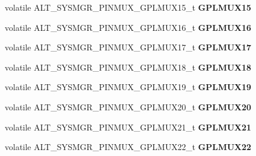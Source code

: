 \begin{DoxyCompactItemize}
volatile A\+L\+T\+\_\+\+S\+Y\+S\+M\+G\+R\+\_\+\+P\+I\+N\+M\+U\+X\+\_\+\+G\+P\+L\+M\+U\+X15\+\_\+t {\bfseries G\+P\+L\+M\+U\+X15}
\item 
\mbox{\label{structALT__SYSMGR__PINMUX__s_a7784a9b4f1f01d7b2e1102db66de13f8}} 
volatile A\+L\+T\+\_\+\+S\+Y\+S\+M\+G\+R\+\_\+\+P\+I\+N\+M\+U\+X\+\_\+\+G\+P\+L\+M\+U\+X16\+\_\+t {\bfseries G\+P\+L\+M\+U\+X16}
\item 
\mbox{\label{structALT__SYSMGR__PINMUX__s_ad2747839d7a380e489369f98df355bf9}} 
volatile A\+L\+T\+\_\+\+S\+Y\+S\+M\+G\+R\+\_\+\+P\+I\+N\+M\+U\+X\+\_\+\+G\+P\+L\+M\+U\+X17\+\_\+t {\bfseries G\+P\+L\+M\+U\+X17}
\item 
\mbox{\label{structALT__SYSMGR__PINMUX__s_a397f7b48293d4787fde76ef750ccc78f}} 
volatile A\+L\+T\+\_\+\+S\+Y\+S\+M\+G\+R\+\_\+\+P\+I\+N\+M\+U\+X\+\_\+\+G\+P\+L\+M\+U\+X18\+\_\+t {\bfseries G\+P\+L\+M\+U\+X18}
\item 
\mbox{\label{structALT__SYSMGR__PINMUX__s_a714e6cd7e143ce6252e88c6b90ba5556}} 
volatile A\+L\+T\+\_\+\+S\+Y\+S\+M\+G\+R\+\_\+\+P\+I\+N\+M\+U\+X\+\_\+\+G\+P\+L\+M\+U\+X19\+\_\+t {\bfseries G\+P\+L\+M\+U\+X19}
\item 
\mbox{\label{structALT__SYSMGR__PINMUX__s_ad74ef6b2768adc3d47b10f1dfcac5d62}} 
volatile A\+L\+T\+\_\+\+S\+Y\+S\+M\+G\+R\+\_\+\+P\+I\+N\+M\+U\+X\+\_\+\+G\+P\+L\+M\+U\+X20\+\_\+t {\bfseries G\+P\+L\+M\+U\+X20}
\item 
\mbox{\label{structALT__SYSMGR__PINMUX__s_a0dff7d1aec6a5e0de83add1873e05769}} 
volatile A\+L\+T\+\_\+\+S\+Y\+S\+M\+G\+R\+\_\+\+P\+I\+N\+M\+U\+X\+\_\+\+G\+P\+L\+M\+U\+X21\+\_\+t {\bfseries G\+P\+L\+M\+U\+X21}
\item 
\mbox{\label{structALT__SYSMGR__PINMUX__s_a5ee75fc8cbdc802acf8bcc535a9210bc}} 
volatile A\+L\+T\+\_\+\+S\+Y\+S\+M\+G\+R\+\_\+\+P\+I\+N\+M\+U\+X\+\_\+\+G\+P\+L\+M\+U\+X22\+\_\+t {\bfseries G\+P\+L\+M\+U\+X22}
\item 
\mbox{\label{structALT__SYSMGR__PINMUX__s_a360c6e04a5df0e965f48102e4c40c302}} 

\end{DoxyCompactItemize}
